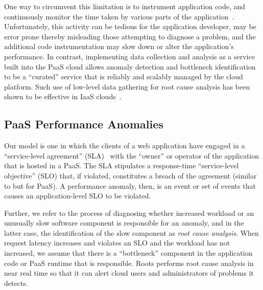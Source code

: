 One way to circumvent this 
limitation is to instrument application code, and continuously monitor the time taken by various
parts of the application~\cite{newrelic,datadog,dynatrace}. 
Unfortunately, this activity can be tedious for the application developer, 
may be error prone thereby misleading those attempting to
diagnose a problem, and
the additional code instrumentation may slow down or alter the application's
performance. 
In contrast, implementing data collection and analysis as a service built into the PaaS cloud allows 
anomaly detection and bottleneck identification to be a ``curated'' service that is 
reliably and scalably managed by the cloud platform. Such use of low-level data gathering
for root cause analysis has been shown to be effective in IaaS clouds~\cite{Dean:2014:PTR:2696535.2696551}.

\subsection{PaaS Performance Anomalies}


Our model is
one in which the clients of a web application have engaged in a
``service-level agreement'' (SLA)~\cite{Keller:2003:WFS:635430.635442}
with the ``owner'' or operator of the application that is hosted in a PaaS.  The SLA
stipulates a response-time ``service-level objective'' (SLO) that, if violated, constitutes a breach of the
agreement (similar to \cite{Nguyen:2011:PPR:2038633.2038634} but for PaaS).  
A performance anomaly, then, is an event or set of events that
causes an application-level SLO to be violated.

Further, we refer to the process of diagnosing whether increased workload or
an unusually slow software component is responsible for an anomaly, and in the
latter case, the identification of the slow component as \textit{root cause
analysis}.  When request latency increases and violates an SLO and the
workload has not increased, we assume that there is a ``bottleneck'' component
in the application code or PaaS runtime that is responsible.  Roots performs
root cause analysis in near real time so that it can alert cloud users and
administrators of problems it detects.


